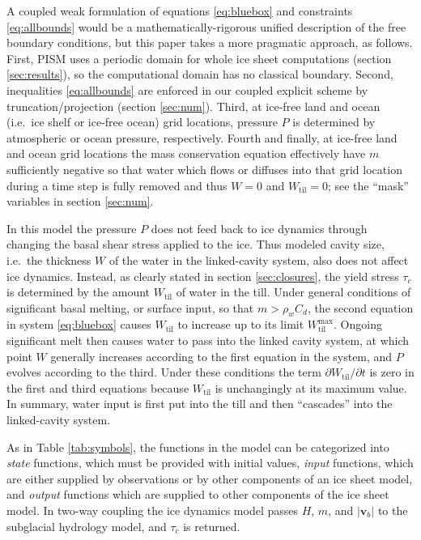 \documentclass[gmd]{copernicus}   %
\begin{document}
A coupled weak formulation of equations \eqref{eq:bluebox} and constraints \eqref{eq:allbounds} would be a mathematically-rigorous unified description of the free boundary conditions, but this paper takes a more pragmatic approach, as follows.  First, PISM uses a periodic domain for whole ice sheet computations (section \ref{sec:results}), so the computational domain has no classical boundary.  Second, inequalities \eqref{eq:allbounds} are enforced in our coupled explicit scheme by truncation/projection (section \ref{sec:num}).  Third, at ice-free land and ocean (i.e.~ice shelf or ice-free ocean) grid locations, pressure $P$ is determined by atmospheric or ocean pressure, respectively.  Fourth and finally, at ice-free land and ocean grid locations the mass conservation equation effectively have $m$ sufficiently negative so that water which flows or diffuses into that grid location during a time step is fully removed and thus $W=0$ and $W_{\text{til}}=0$; see the ``mask'' variables in section \ref{sec:num}.

In this model the pressure $P$ does not feed back to ice dynamics through changing the basal shear stress applied to the ice.  Thus modeled cavity size, i.e.~the thickness $W$ of the water in the linked-cavity system, also does not affect ice dynamics.  Instead, as clearly stated in section \ref{sec:closures}, the yield stress $\tau_c$ is determined by the amount $W_{\text{til}}$ of water in the till.  Under general conditions of significant basal melting, or surface input, so that $m > \rho_w C_d$, the second equation in system \eqref{eq:bluebox} causes $W_{\text{til}}$ to increase up to its limit $W_{\text{til}}^{\text{max}}$.  Ongoing significant melt then causes water to pass into the linked cavity system, at which point $W$ generally increases according to the first equation in the system, and $P$ evolves according to the third.  Under these conditions the term $\partial W_{\text{til}}/\partial t$ is zero in the first and third equations because $W_{\text{til}}$ is unchangingly at its maximum value.  In summary, water input is first put into the till and then ``cascades'' into the linked-cavity system.

As in Table \ref{tab:symbols}, the functions in the model can be categorized into \emph{state} functions, which must be provided with initial values, \emph{input} functions, which are either supplied by observations or by other components of an ice sheet model, and \emph{output} functions which are supplied to other components of the ice sheet model.  In two-way coupling the ice dynamics model passes $H$, $m$, and $|\mathbf{v}_b|$ to the subglacial hydrology model, and $\tau_c$ is returned.
\end{document}
